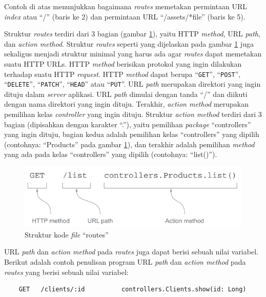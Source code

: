 Contoh di atas menunjukkan bagaimana \textit{routes} memetakan permintaan URL \textit{index} atau ``/'' (baris ke 2) dan permintaan URL ``/assets/*file'' (baris ke 5).

Struktur \textit{routes} terdiri dari 3 bagian (gambar \ref{fig:2_routes}), yaitu HTTP \textit{method}, URL \textit{path}, dan \textit{action method}. Struktur \textit{routes} seperti yang dijelaskan pada gambar \ref{fig:2_routes} juga sekaligus menjadi struktur minimal yang harus ada agar \textit{routes} dapat memetakan suatu HTTP URLs. HTTP \textit{method} berisikan protokol yang ingin dilakukan terhadap suatu HTTP \textit{request}. HTTP \textit{method} dapat berupa ``\texttt{GET}'', ``\texttt{POST}'', ``\texttt{DELETE}'', ``\texttt{PATCH}'', ``\texttt{HEAD}'' atau ``\texttt{PUT}''\cite{playframeworkweb}. URL \textit{path} merupakan direktori yang ingin dituju dalam \textit{server} aplikasi. URL \textit{path} dimulai dengan tanda ``/'' dan diikuti dengan nama direktori yang ingin dituju. Terakhir, \textit{action method} merupakan pemilihan kelas \textit{controller} yang ingin dituju. Struktur \textit{action method} terdiri dari 3 bagian (dipisahkan dengan karakter ``.''), yaitu pemilihan \textit{package} ``controllers'' yang ingin dituju, bagian kedua adalah pemilihan kelas ``controllers'' yang dipilih (contohnya: ``Products'' pada gambar \ref{fig:2_routes}), dan terakhir adalah pemilihan \textit{method} yang ada pada kelas ``controllers'' yang dipilih (contohnya: ``list()'').

\begin{figure}[htbp]
	\centering
		\includegraphics[scale=0.8]{Gambar/2_routes.PNG}
	\caption{Struktur kode \textit{file} ``routes''\cite{playforjava}}
	\label{fig:2_routes}
\end{figure}

URL \textit{path} dan \textit{action method} pada \textit{routes} juga dapat berisi sebuah nilai variabel. Berikut adalah contoh penulisan program URL \textit{path} dan \textit{action method} pada \textit{routes} yang berisi sebuah nilai variabel:

\begin{lstlisting}
	GET   /clients/:id          controllers.Clients.show(id: Long)
\end{lstlisting}

